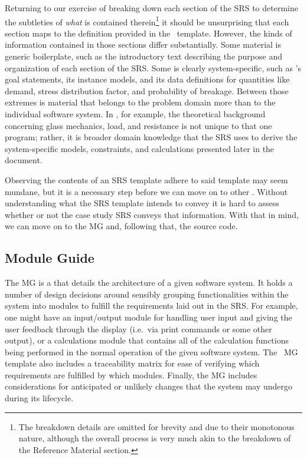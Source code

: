 Returning to our exercise of breaking down each section of the SRS to determine 
the subtleties of \emph{what} is contained therein\footnote{The breakdown 
details are omitted for brevity and due to their monotonous nature, although 
the overall process is very much akin to the breakdown of the Reference 
Material section.} it should be unsurprising that each section maps to the 
definition provided in the \smithea{}\ template. However, the kinds of 
information contained in those sections differ substantially. Some material is 
generic boilerplate, such as the introductory text describing the purpose and 
organization of each section of the SRS. Some is clearly system-specific, such 
as \gb{}'s goal statements, its instance models, and its data definitions for 
quantities like demand, stress distribution factor, and probability of 
breakage. Between those extremes is material that belongs to the problem domain 
more than to the individual software system. In \gb{}, for example, the 
theoretical background concerning glass mechanics, load, and resistance is not 
unique to that one program; rather, it is broader domain knowledge that the SRS 
uses to derive the system-specific models, constraints, and calculations 
presented later in the document.

Observing the contents of an SRS template adhere to said template may seem 
mundane, but it is a necessary step before we can move on to other \sfs{}. 
Without understanding what the SRS template intends to convey it is hard to 
assess whether or not the case study SRS conveys that information. With that in 
mind, we can move on to the MG and, following that, the source code.

\subsection{Module Guide}
\label{sec:breakdown:mg}

The MG is a \sf{} that details the architecture of a given software system. It
holds a number of design decisions around sensibly grouping
functionalities within the system into modules to fulfill the requirements laid 
out in the SRS. For example, one might have an input/output module for handling 
user input and giving the user feedback through the display (i.e.\ via print 
commands or some other output), or a calculations module that contains all of 
the calculation functions being performed in the normal operation of the given 
software system. The \smithea{}\ MG template also includes a traceability 
matrix for ease of verifying which requirements are fulfilled by which modules. 
Finally, the MG includes considerations for anticipated or unlikely changes 
that the system may undergo during its lifecycle.

